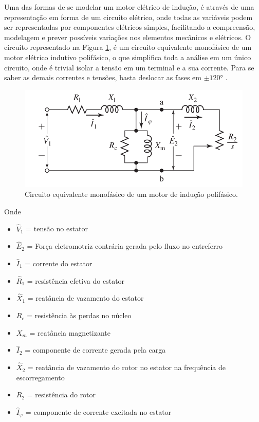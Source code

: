 Uma das formas de se modelar um motor elétrico de indução, é através de uma representação em forma de um circuito 
elétrico, onde todas as variáveis podem ser representadas por componentes elétricos simples, facilitando a compreensão, modelagem e
prever possíveis variações nos elementos mecânicos e elétricos. O circuito representado na Figura \ref{fig:circuit_fitzgerald_p354},
é um circuito equivalente monofásico de um motor elétrico indutivo polifásico, o que simplifica toda a análise em um único circuito,
onde é trivial isolar a tensão em um terminal e a sua corrente. Para se saber as demais correntes e tensões, basta deslocar as fases
em $\pm\ang{120}$ \cite{Umans2003}.

\begin{figure}[H]
    \caption{Circuito equivalente monofásico de um motor de indução polifásico.}
    \begin{center}
        \includegraphics[scale=.35]{referencial/img/circuit_fitzgerald_p354.png}
    \end{center}
    \label{fig:circuit_fitzgerald_p354}
\end{figure}

Onde

\begin{itemize}
    \item $\hat{V}_1$ = tensão no estator
    \item $\hat{E}_2$ = Força eletromotriz contrária gerada pelo fluxo no entreferro
    \item $\hat{I}_1$ = corrente do estator
    \item $\hat{R}_1$ = resistência efetiva do estator
    \item $\hat{X}_1$ = reatância de vazamento do estator
    \item $R_c$ = resistência às perdas no núcleo
    \item $X_m$ = reatância magnetizante
    \item $\hat{I}_2$ = componente de corrente gerada pela carga
    \item $\hat{X}_2$ = reatância de vazamento do rotor no estator na frequência de escorregamento
    \item $R_2$ = resistência do rotor
    \item $\hat{I}_\varphi$ = componente de corrente excitada no estator
\end{itemize}

